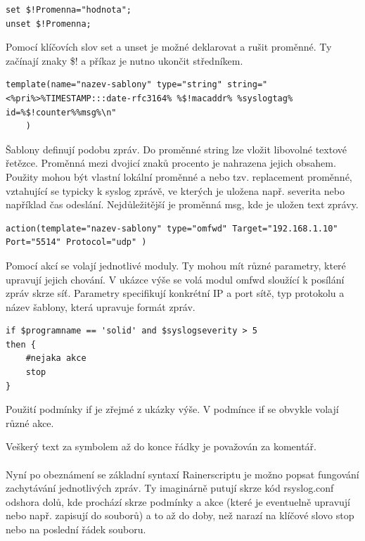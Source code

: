 \documentclass[thesis=B,czech]{FITthesis}[2012/06/26]
\begin{document}
\begin{lstlisting}[style=RainerScriptSimpleStyle]
set $!Promenna="hodnota";
unset $!Promenna;
\end{lstlisting}
Pomocí klíčovích slov set a unset je možné deklarovat a rušit proměnné. Ty začínají znaky \$! a příkaz je nutno ukončit středníkem.

\begin{lstlisting}[style=RainerScriptSimpleStyle]
template(name="nazev-sablony" type="string" string="<%pri%>%TIMESTAMP:::date-rfc3164% %$!macaddr% %syslogtag% id=%$!counter%%msg%\n"
	)
\end{lstlisting}
Šablony definují podobu zpráv. Do proměnné string lze vložit libovolné textové řetězce. Proměnná mezi dvojicí znaků procento je nahrazena jejich obsahem. Použity mohou být vlastní lokální proměnné a nebo tzv. replacement proměnné, vztahující se typicky k syslog zprávě, ve kterých je uložena např. severita nebo například čas odeslání. Nejdůležitější je proměnná msg, kde je uložen text zprávy.

\begin{lstlisting}[style=RainerScriptSimpleStyle]
action(template="nazev-sablony" type="omfwd" Target="192.168.1.10" Port="5514" Protocol="udp" )
\end{lstlisting}

Pomocí akcí se volají jednotlivé moduly. Ty mohou mít různé parametry, které upravují jejich chování. V ukázce výše se volá modul omfwd sloužící k posílání zpráv skrze síť. Parametry specifikují konkrétní IP a port sítě, typ protokolu a název šablony, která upravuje formát zpráv.

\begin{lstlisting}[style=RainerScriptSimpleStyle]
if $programname == 'solid' and $syslogseverity > 5
then {
	#nejaka akce
	stop
}
\end{lstlisting}
	
Použití podmínky if je zřejmé z ukázky výše. V podmínce if se obvykle volají různé akce.

Veškerý text za symbolem \uv{\#} až do konce řádky je považován za komentář.
\\
\\
Nyní po obeznámení se základní syntaxí Rainerscriptu je možno popsat fungování zachytávání jednotlivých zpráv. Ty imaginárně putují skrze kód rsyslog.conf odshora dolů, kde prochází skrze podmínky a akce (které je eventuelně upravují nebo např. zapisují do souborů) a to až do doby, než narazí na klíčové slovo stop nebo na poslední řádek souboru.
\end{document}
